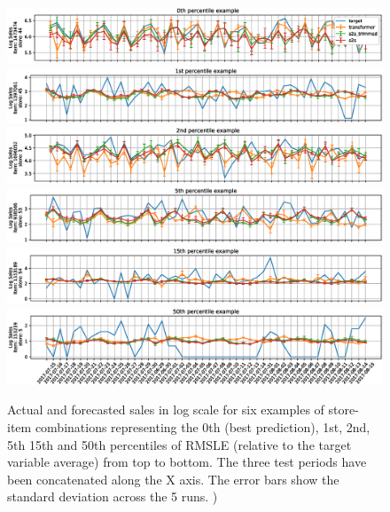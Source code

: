 \begin{figure}
	\centering
	\includegraphics[width=1\linewidth]{salesforecast/images/sample_0_log}
	\includegraphics[width=1\linewidth]{salesforecast/images/sample_1_log}
	\includegraphics[width=1\linewidth]{salesforecast/images/sample_2_log}
	\includegraphics[width=1\linewidth]{salesforecast/images/sample_3_log}
	\includegraphics[width=1\linewidth]{salesforecast/images/sample_4_log}
	\includegraphics[width=1\linewidth]{salesforecast/images/sample_5_log}
\caption{Actual and forecasted sales in log scale for six examples of store-item combinations representing the 0th (best prediction), 1st, 2nd, 5th 15th and 50th percentiles of RMSLE (relative to the target variable average) from top to bottom. The three test periods have been concatenated along the X axis. The error bars show the standard deviation across the 5 runs. )}
	\label{fig:ts_log}
\end{figure}

